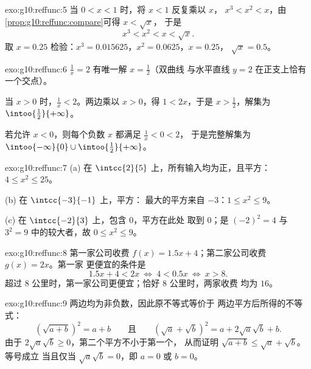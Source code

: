 \begin{solution}{exo:g10:reffunc:5}
当 $0 < x < 1$ 时，将 $x < 1$ 反复乘以 $x$，
$x^3 < x^2 < x$，由\cref{prop:g10:reffunc:compare}可得 $x < \sqrt x$，
于是
\[
x^3 < x^2 < x < \sqrt x .
\]
取 $x = 0.25$ 检验：$x^3 = 0.015625$，$x^2 = 0.0625$，$x = 0.25$，
$\sqrt x = 0.5$。
\end{solution}

\begin{solution}{exo:g10:reffunc:6}
$\frac1x = 2$ 有唯一解 $x = \frac12$（双曲线
与水平直线 $y = 2$ 在正支上恰有一个交点）。

当 $x > 0$ 时，$\frac1x < 2$。两边乘以 $x > 0$，得 $1 < 2x$，于是
$x > \frac12$，解集为 $\intoo{\frac12}{+\infty}$。

若允许 $x < 0$，则每个负数 $x$ 都满足 $\frac1x < 0 < 2$，
于是完整解集为
$\intoo{-\infty}{0} \cup \intoo{\frac12}{+\infty}$。
\end{solution}

\begin{solution}{exo:g10:reffunc:7}
(a) 在 $\intcc{2}{5}$ 上，所有输入均为正，且平方：
$4 \leq x^2 \leq 25$。

(b) 在 $\intcc{-3}{-1}$ 上，平方：
最大的平方来自 $-3$：$1 \leq x^2 \leq 9$。

(c) 在 $\intcc{-2}{3}$ 上，包含 $0$，平方在此处
取到 $0$；是 $(-2)^2 = 4$ 与
$3^2 = 9$ 中的较大者，故 $0 \leq x^2 \leq 9$。
\end{solution}

\begin{solution}{exo:g10:reffunc:8}
第一家公司收费 $f(x) = 1.5x + 4$；第二家公司收费 $g(x) = 2x$。第一家
更便宜的条件是
\[
1.5x + 4 < 2x
\ \Longleftrightarrow\
4 < 0.5x
\ \Longleftrightarrow\
x > 8 .
\]
超过 $8$ 公里时，第一家公司更便宜；恰好 $8$ 公里时，两家收费
均为 $16$。
\end{solution}

\begin{solution}{exo:g10:reffunc:9}
两边均为非负数，因此原不等式等价于
两边平方后所得的不等式：
\[
\left(\sqrt{a+b}\right)^2 = a + b
\qquad\text{且}\qquad
\left(\sqrt a + \sqrt b\right)^2 = a + 2\sqrt a \sqrt b + b .
\]
由于 $2\sqrt a\sqrt b \geq 0$，第二个平方不小于第一个，
从而证明 $\sqrt{a+b} \leq \sqrt a + \sqrt b$。等号成立
当且仅当 $\sqrt a \sqrt b = 0$，即 $a = 0$ 或 $b = 0$。
\end{solution}

